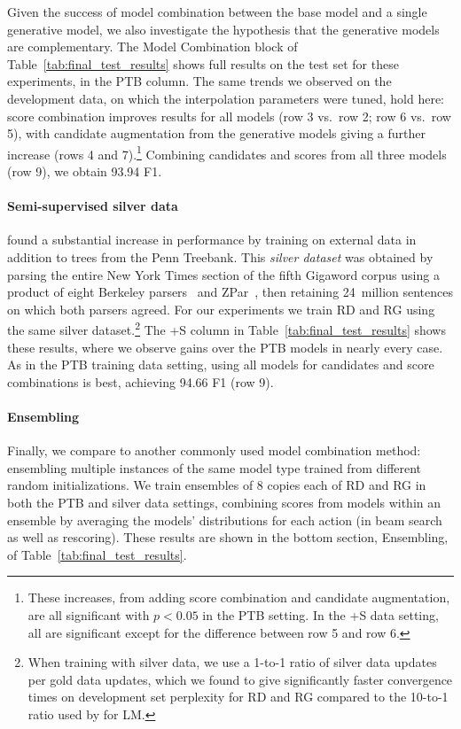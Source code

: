 \documentclass[11pt,a4paper]{article}
\begin{document}
Given the success of model combination between the base model and a single generative model, we also investigate the hypothesis that the generative models are complementary. The Model Combination block of Table~\ref{tab:final_test_results} shows full results on the test set for these experiments, in the PTB column. The same trends we observed on the development data, on which the interpolation parameters were tuned, hold here: score combination improves results for all models (row 3 vs.\ row 2; row 6 vs.\ row 5), with candidate augmentation from the generative models giving a further increase (rows 4 and 7).\footnote{These increases, from adding score combination and candidate augmentation, are all significant with $p < 0.05$ in the PTB setting. In the +S data setting, all are significant except for the difference between row 5 and row 6.} Combining candidates and scores from all three models (row 9), we obtain 93.94 F1.

\paragraph{Semi-supervised silver data}
\mbox{}\citet{Choe16Parsing} found a substantial increase in performance by training on external data in addition to trees from the Penn Treebank. This \emph{silver dataset} was obtained by parsing the entire New York Times section of the fifth Gigaword corpus using a product of eight Berkeley parsers~\citep{Petrov10Products} and ZPar~\citep{Zhu13Fast}, then retaining 24~million sentences on which both parsers agreed.
For our experiments we train RD and RG using the same silver dataset.\footnote{When training with silver data, we use a 1-to-1 ratio of silver data updates per gold data updates, which we found to give significantly faster convergence times on development set perplexity for RD and RG compared to the 10-to-1 ratio used by \citet{Choe16Parsing} for LM. 
}
The +S column in Table~\ref{tab:final_test_results} shows these results, where we observe gains over the PTB models in nearly every case. As in the PTB training data setting, using all models for candidates and score combinations is best, achieving 94.66 F1 (row 9).

\paragraph{Ensembling}
Finally, we compare to another commonly used model combination method: ensembling multiple instances of the same model type trained from different random initializations. We train ensembles of 8 copies each of RD and RG in both the PTB and silver data settings, combining scores from models within an ensemble by averaging the models' distributions for each action (in beam search as well as rescoring). These results are shown in the bottom section, Ensembling, of Table~\ref{tab:final_test_results}. 
\end{document}
